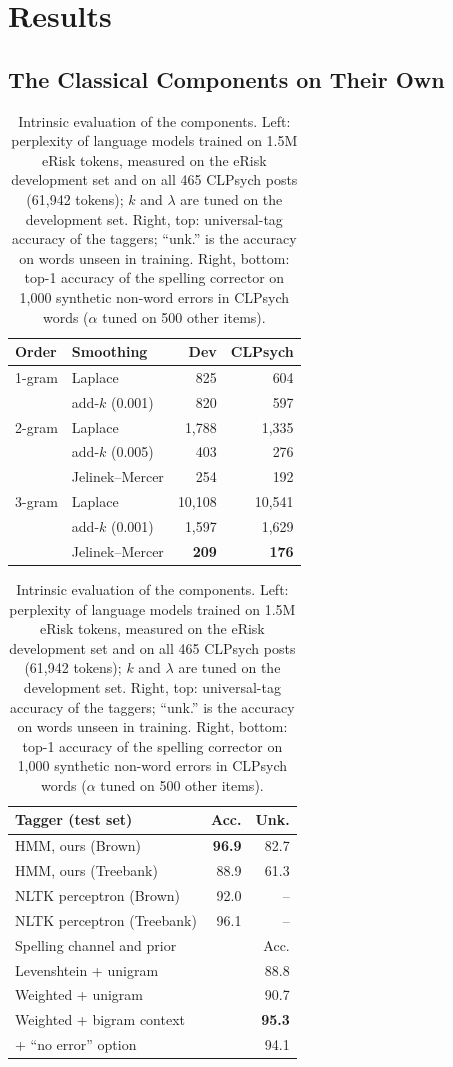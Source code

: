 \documentclass[runningheads]{llncs}
\begin{document}
\section{Results}

\subsection{The Classical Components on Their Own}

\begin{table}[t]
\caption{Intrinsic evaluation of the components. Left: perplexity of language models trained on 1.5M eRisk tokens, measured on the eRisk development set and on all 465 CLPsych posts (61,942 tokens); $k$ and $\lambda$ are tuned on the development set. Right, top: universal-tag accuracy of the taggers; ``unk.'' is the accuracy on words unseen in training. Right, bottom: top-1 accuracy of the spelling corrector on 1,000 synthetic non-word errors in CLPsych words ($\alpha$ tuned on 500 other items).}
\label{tab:components}
\centering\small
\begin{tabular}[t]{@{}llrr@{}}
\toprule
Order & Smoothing & Dev & CLPsych \\
\midrule
1-gram & Laplace          & 825 & 604 \\
       & add-$k$ (0.001)  & 820 & 597 \\
2-gram & Laplace          & 1,788 & 1,335 \\
       & add-$k$ (0.005)  & 403 & 276 \\
       & Jelinek--Mercer  & 254 & 192 \\
3-gram & Laplace          & 10,108 & 10,541 \\
       & add-$k$ (0.001)  & 1,597 & 1,629 \\
       & Jelinek--Mercer  & \textbf{209} & \textbf{176} \\
\bottomrule
\end{tabular}\hfill
\begin{tabular}[t]{@{}lrr@{}}
\toprule
Tagger (test set) & Acc. & Unk. \\
\midrule
HMM, ours (Brown)          & \textbf{96.9} & 82.7 \\
HMM, ours (Treebank)       & 88.9 & 61.3 \\
NLTK perceptron (Brown)    & 92.0 & -- \\
NLTK perceptron (Treebank) & 96.1 & -- \\
\midrule
Spelling channel and prior & \multicolumn{2}{r}{Acc.} \\
\midrule
Levenshtein + unigram      & \multicolumn{2}{r}{88.8} \\
Weighted + unigram         & \multicolumn{2}{r}{90.7} \\
Weighted + bigram context  & \multicolumn{2}{r}{\textbf{95.3}} \\
\quad + ``no error'' option & \multicolumn{2}{r}{94.1} \\
\bottomrule
\end{tabular}
\end{table}
\end{document}
